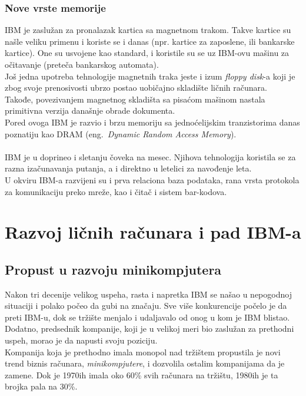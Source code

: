 \documentclass[a4paper]{article}
\begin{document}
\subsubsection*{Nove vrste memorije}
IBM je zaslužan za pronalazak kartica sa magnetnom trakom. Takve kartice su našle veliku primenu i koriste se i danas (npr. kartice za zaposlene, ili bankarske kartice). One su usvojene kao standard, i koristile su se uz IBM-ovu mašinu za očitavanje (preteča bankarskog automata).\\
Još jedna upotreba tehnologije magnetnih traka jeste i izum \emph{floppy disk}-a koji je zbog svoje prenosivosti ubrzo postao uobičajno skladište ličnih računara.\\ Takođe, povezivanjem magnetnog skladišta sa pisaćom mašinom nastala primitivna verzija današnje obrade dokumenta.\\
Pored ovoga IBM je razvio i brzu memoriju sa jednoćelijskim tranzistorima danas poznatiju kao DRAM (eng.~{\em Dynamic Random Access Memory}).%
\\ \\
IBM je u doprineo i sletanju čoveka na mesec. Njihova tehnologija koristila se za razna izačunavanja putanja, a i direktno u letelici za navođenje leta.\\
U okviru IBM-a razvijeni su i prva relaciona baza podataka, rana vrsta protokola za komunikaciju preko mreže, kao i čitač i sistem bar-kodova.
%
\section{Razvoj ličnih računara i pad IBM-a}
\subsection{Propust u razvoju minikompjutera}
Nakon tri decenije velikog uspeha, rasta i napretka IBM se našao u nepogodnoj situaciji i polako počeo da gubi na značaju. %
Sve više konkurencije počelo je da preti IBM-u, dok se tržište menjalo i udaljavalo od onog u kom je IBM blistao. Dodatno, predsednik kompanije, koji je u velikoj meri bio zaslužan za prethodni uspeh, morao je da napusti svoju poziciju.\\%
Kompanija koja je prethodno imala monopol nad tržištem propustila je novi trend biznis računara, \emph{minikompjutere}, i dozvolila ostalim kompanijama da je zamene. Dok je 1970ih imala oko 60\% svih računara na tržištu, 1980ih je ta brojka pala na 30\%. %
\end{document}
